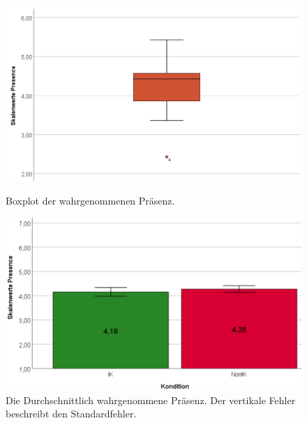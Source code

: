\documentclass[a4paper,11pt]{article}%
\renewcommand{\\}{\vspace*{0.5\baselineskip} \newline}
\begin{document}
\begin{figure}[H]
   \begin{minipage}[t]{.5\linewidth} %
      \includegraphics[width=\linewidth]{Abbildungen/AuswertungDiagramme/BP_Presence.png}
      \caption[Boxplot der wahrgenommenen Präsenz]{Boxplot der wahrgenommenen Präsenz.}
      \label{SD_PresenceBP}
   \end{minipage}
   \hspace{.02\linewidth}%
   \begin{minipage}[t]{.5\linewidth} %
     \includegraphics[width=\linewidth]{Abbildungen/AuswertungDiagramme/SD_Presence_Mittelwerte.png}
      \caption[Durchschnittlich \textit{wahrgenommene Präsenz} der Konditionen]{Die Durchschnittlich wahrgenommene Präsenz. Der vertikale Fehler beschreibt den Standardfehler.}
       \label{SD_Presence_Mittel}
   \end{minipage}
\end{figure}
\end{document}

